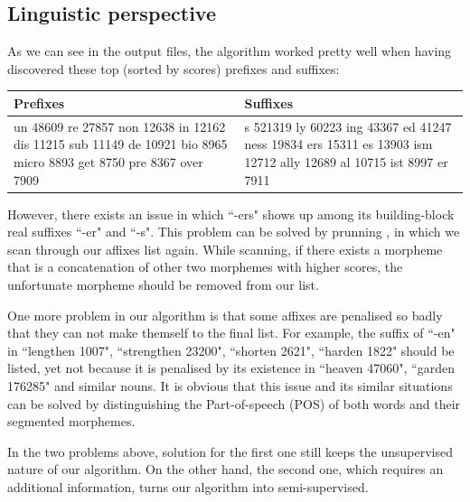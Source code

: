 \documentclass[12pt]{article}
\begin{document}
\subsection{Linguistic perspective}
As we can see in the output files, the algorithm worked pretty well when having discovered these top (sorted by scores) prefixes and suffixes:
\begin{table}[H]
	\begin{tabular}{| p{6.5cm} | p{6.5cm} |}
		\hline
		Prefixes & Suffixes \\
		\hline
		un 48609\newline
		re 27857\newline
		non 12638\newline
		in 12162\newline
		dis 11215\newline
		sub 11149\newline
		de 10921\newline
		bio 8965\newline
		micro 8893\newline
		get 8750\newline
		pre 8367\newline
		over 7909
		& 
		s 521319\newline
		ly 60223\newline
		ing 43367\newline
		ed 41247\newline
		ness 19834\newline
		ers 15311\newline
		es 13903\newline
		ism 12712\newline
		ally 12689\newline
		al 10715\newline
		ist 8997\newline
		er 7911\\
		\hline
	\end{tabular}
\end{table}
However, there exists an issue in which ``-ers" shows up among its building-block real suffixes ``-er" and ``-s". This problem can be solved by prunning \cite{keshava2006simpler}, in which we scan through our affixes list again. While scanning, if there exists a morpheme that is a concatenation of other two morphemes with higher scores, the unfortunate morpheme should be removed from our list.

One more problem in our algorithm is that some affixes are penalised so badly that they can not make themself to the final list. For example, the suffix of ``-en" in ``lengthen 1007", ``strengthen 23200", ``shorten 2621", ``harden 1822" should be listed, yet not because it is penalised by its existence in ``heaven 47060", ``garden 176285" and similar nouns. It is obvious that this issue and its similar situations can be solved by distinguishing the Part-of-speech (POS) of both words and their segmented morphemes.

In the two problems above, solution for the first one still keeps the unsupervised nature of our algorithm. On the other hand, the second one, which requires an additional information, turns our algorithm into semi-supervised.



\end{document}
